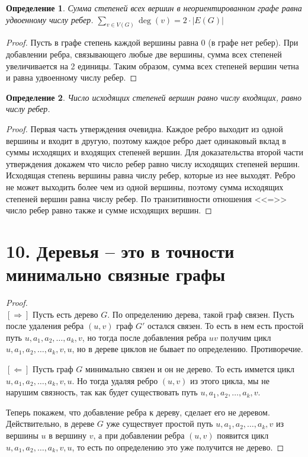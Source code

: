 \documentclass[a4paper,12pt]{article}
\newtheorem*{defin}{Определение}
\begin{document}
        \begin{defin}
            Сумма степеней всех вершин в неориентированном графе равна удвоенному числу ребер. $\displaystyle\sum_{v \in V(G)} \deg(v) = 2 \cdot |E(G)|$
        \end{defin}
        \begin{proof}
            Пусть в графе степень каждой вершины равна $0$ (в графе нет ребер). При добавлении ребра, связывающего любые две вершины, сумма всех степеней увеличивается на 2 единицы. Таким образом, сумма всех степеней вершин четна и равна удвоенному числу ребер.
        \end{proof}
        \begin{defin}
            Число исходящих степеней вершин равно числу входящих, равно числу ребер.
        \end{defin}
        \begin{proof}
            Первая часть утверждения очевидна. Каждое ребро выходит из одной вершины и входит в другую, поэтому каждое ребро дает одинаковый вклад в суммы исходящих и входящих степеней вершин. Для доказательства второй части утверждения докажем что число ребер равно числу исходящих степеней вершин. Исходящая степень вершины равна числу ребер, которые из нее выходят. Ребро не может выходить более чем из одной вершины, поэтому сумма исходящих степеней вершин равна числу ребер. По транзитивности отношения <<=>> число ребер равно также и сумме исходящих вершин.
        \end{proof}
    \section*{10. Деревья -- это в точности минимально связные графы}
        \begin{proof}\ \\
            $[\Rightarrow]$ Пусть есть дерево $G$. По определению дерева, такой граф связен. Пусть после удаления ребра $(u,v)$ граф $G'$ остался связен. То есть в нем есть простой путь $u, a_{1}, a_{2}, \ldots, a_{k}, v$, но тогда после добавления ребра $uv$ получим цикл $u, a_{1}, a_{2}, \ldots, a_{k}, v, u$, но в дереве циклов не бывает по определению. Противоречие.

            \noindent$[\Leftarrow]$ Пусть граф $G$ минимально связен и он не дерево. То есть иммется цикл $u, a_{1}, a_{2}, \ldots, a_{k}, v, u$. Но тогда удаляя ребро $(u, v)$ из этого цикла, мы не нарушим связность, так как будет существовать путь $u, a_{1}, a_{2}, \ldots, a_{k}, v$.

            \noindent Теперь покажем, что добавление ребра к дереву, сделает его не деревом. Действительно, в дереве $G$ уже существует простой путь $u, a_{1}, a_{2}, \ldots, a_{k}, v$ из вершины $u$ в вершину $v$, а при добавлении ребра $(u, v)$ появится цикл $u, a_{1}, a_{2}, \ldots, a_{k}, v, u$, то есть по определению это уже получится не дерево. 
        \end{proof}
    \pagebreak %
\end{document}
